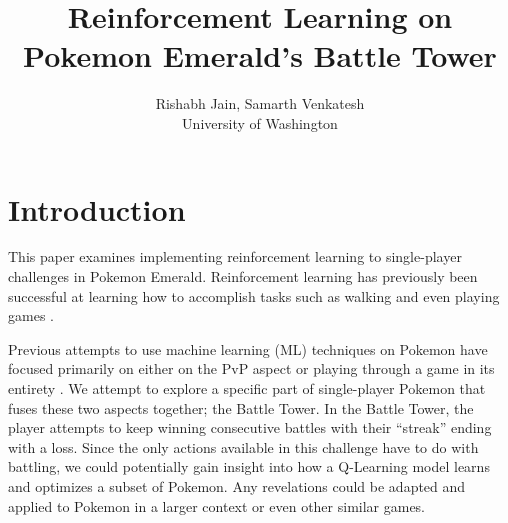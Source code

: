 \documentclass[10pt,twocolumn,letterpaper]{article}
\begin{document}
\title{Reinforcement Learning on Pokemon Emerald's Battle Tower}

\author{Rishabh Jain, Samarth Venkatesh \\
University of Washington \\
}
\maketitle


\section{Introduction}
\label{sec:intro}

This paper examines implementing reinforcement learning to single-player challenges in Pokemon Emerald.
Reinforcement learning has previously been successful at learning how to accomplish tasks such as
walking \cite{Haarnoja} and even playing games \cite{Mnih}.

Previous attempts to use machine learning (ML) techniques on Pokemon have focused primarily on either on the PvP aspect \cite{Hu} or
playing through a game in its entirety \cite{Whiddy}. We attempt to explore a specific part
of single-player Pokemon that fuses these two aspects together; the Battle Tower. In the Battle Tower,
the player attempts to keep winning consecutive battles with their ``streak'' ending with a loss.
Since the only actions available in this challenge have to do with battling, we could potentially
gain insight into how a Q-Learning model learns and optimizes a subset of Pokemon.
Any revelations could be adapted and applied to Pokemon in a larger context or even other similar games.
\end{document}
